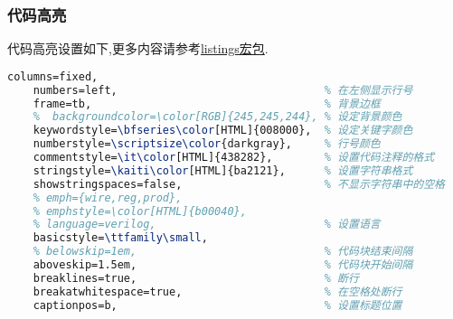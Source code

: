 \documentclass[list,answers,csize4,custom]{sysuexam}
\begin{document}
\subsubsection{代码高亮}
代码高亮设置如下,更多内容请参考\href{http://texdoc.net/texmf-dist/doc/latex/listings/listings.pdf}{listings宏包}.
\begin{lstlisting}[title=代码高亮设置,language=tex,firstnumber=220]
    columns=fixed,
    numbers=left,                                % 在左侧显示行号
    frame=tb,                                    % 背景边框
    %  backgroundcolor=\color[RGB]{245,245,244}, % 设定背景颜色
    keywordstyle=\bfseries\color[HTML]{008000},  % 设定关键字颜色
    numberstyle=\scriptsize\color{darkgray},     % 行号颜色
    commentstyle=\it\color[HTML]{438282},        % 设置代码注释的格式
    stringstyle=\kaiti\color[HTML]{ba2121},      % 设置字符串格式
    showstringspaces=false,                      % 不显示字符串中的空格
    % emph={wire,reg,prod},
    % emphstyle=\color[HTML]{b00040},
    % language=verilog,                          % 设置语言
    basicstyle=\ttfamily\small,
    % belowskip=1em,                             % 代码块结束间隔 
    aboveskip=1.5em,                             % 代码块开始间隔 
    breaklines=true,                             % 断行
    breakatwhitespace=true,                      % 在空格处断行
    captionpos=b,                                % 设置标题位置
\end{lstlisting}
\end{document}
